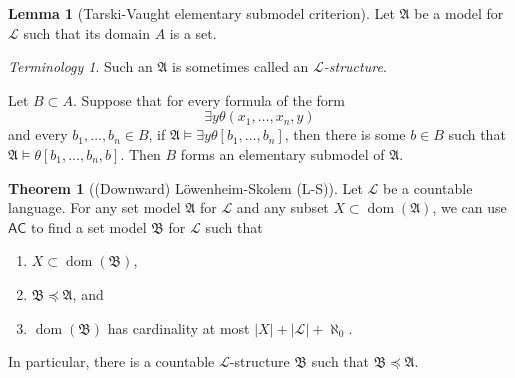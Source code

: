 \documentclass[10pt,letterpaper,cm]{nupset}
\theoremstyle{definition}
\theoremstyle{theorem}
\newtheorem{theorem}[definition]{Theorem}
\newtheorem{lemma}[definition]{Lemma}
\theoremstyle{remark}
\newtheorem*{term}{Terminology}
\newcommand{\A}{\mathfrak A}
\renewcommand{\L}{\mathcal L}
\newcommand{\B}{\mathfrak{B}}
\newcommand{\1}{\mathbf{1}}
\newcommand{\0}{\vec 0}
\newcommand{\ac}{\mathsf{AC}}
\DeclareMathOperator{\dom}{dom}
\newcommand{\be}{\begin{enumerate}}
\newcommand{\ee}{\end{enumerate}}
\begin{document}
\begin{lemma}[Tarski-Vaught elementary submodel criterion]\label{TV}
Let $\A$ be a model for $\L$ such that its domain $A$ is a set. 
\begin{term}
Such an $\A$ is sometimes called an \textit{$\L$-structure}.
\end{term}
 Let $B \subset A$. Suppose that for every formula of the form $$\exists y \theta(x_1, \ldots, x_n, y)$$ and every $b_1, \ldots, b_n \in B$, if $\A \models \exists y \theta[b_1, \ldots, b_n]$, then there is some $b \in B$ such that $\A \models \theta[b_1, \ldots, b_n, b]$.
Then $B$ forms an elementary submodel of $\A$. 
\end{lemma}

\begin{theorem}[(Downward) L\"owenheim-Skolem (L-S)]\label{LS}
Let $\L$ be a countable language. For any set model $\A$ for $\L$ and any subset $X\subset \dom(\A)$, we can use $\ac$ to find a set model $\B$ for $\L$ such that 
\be[label=(\alph*)]
\item $X\subset \dom(\B)$, 
\item $\B \preceq \A$, and
\item $\dom(\B)$ has cardinality at most $\left\lvert{X}\right\rvert + \left\lvert{\L}\right\rvert +\aleph_0$.
\ee 
In particular, there is a countable $\L$-structure $\B$ such that $\B \preceq \A$.
\end{theorem}
\end{document}

